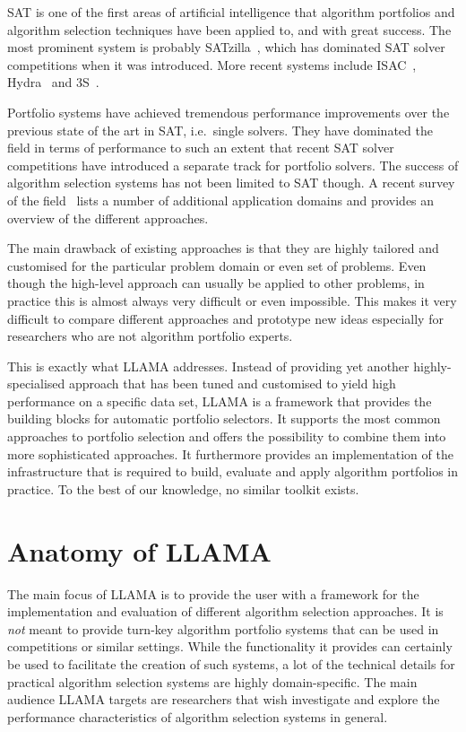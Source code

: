 \documentclass{llncs}
\begin{document}
SAT is one of the first areas of artificial intelligence that algorithm
portfolios and algorithm selection techniques have been applied to, and with
great success. The most prominent system is probably
SATzilla~\cite{xu_satzilla_2008}, which has dominated SAT solver competitions
when it was introduced. More recent systems include
ISAC~\cite{kadioglu_isac_2010}, Hydra~\cite{xu_hydra_2010} and
3S~\cite{kadioglu_algorithm_2011}.

Portfolio systems have achieved tremendous performance improvements over the
previous state of the art in SAT, i.e.\ single solvers. They have dominated the
field in terms of performance to such an extent that recent SAT solver
competitions have introduced a separate track for portfolio solvers. The success
of algorithm selection systems has not been limited to SAT though. A recent
survey of the field~\cite{kotthoff_algorithm_2012} lists a number of additional
application domains and provides an overview of the different approaches.

\medskip

The main drawback of existing approaches is that they are highly tailored
and customised for the particular problem domain or even set of problems. Even
though the high-level approach can usually be applied to other problems, in
practice this is almost always very difficult or even impossible. This makes it
very difficult to compare different approaches and prototype new ideas
especially for researchers who are not algorithm portfolio experts.

This is exactly what LLAMA addresses. Instead of providing yet another
highly-specialised approach that has been tuned and customised to yield high
performance on a specific data set, LLAMA is a framework that provides the
building blocks for automatic portfolio selectors. It supports the most common
approaches to portfolio selection and offers the possibility to combine them
into more sophisticated approaches. It furthermore provides an implementation of
the infrastructure that is required to build, evaluate and apply algorithm
portfolios in practice. To the best of our knowledge, no similar toolkit exists.


\section{Anatomy of LLAMA}

The main focus of LLAMA is to provide the user with a framework for the
implementation and evaluation of different algorithm selection approaches. It is
\emph{not} meant to provide turn-key algorithm portfolio systems that can be
used in competitions or similar settings. While the functionality it provides
can certainly be used to facilitate the creation of such systems, a lot of the
technical details for practical algorithm selection systems are highly
domain-specific. The main audience LLAMA targets are researchers that wish
investigate and explore the performance characteristics of algorithm selection
systems in general.
\end{document}
